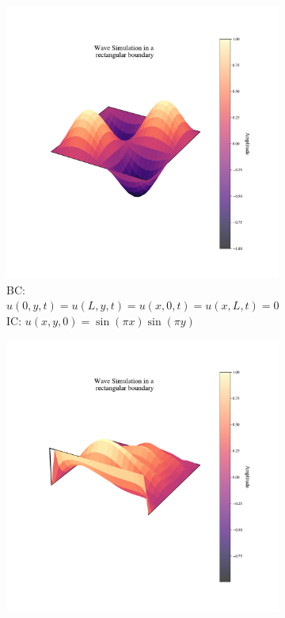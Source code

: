 \documentclass{article}
\begin{document}
\begin{figure}[htbp]
    \centering
    \begin{subfigure}{0.45\textwidth}
        \centering
        \includegraphics[width=\textwidth]{figures/Figure_1.pdf}
        \caption{BC: \(u(0, y, t) = u(L, y, t) = u(x, 0, t) = u(x, L, t) = 0\)\\ IC: \(u(x, y, 0) = \sin(\pi x) \sin(\pi y)\)}
    \end{subfigure}%
    \hfill
    \begin{subfigure}{0.45\textwidth}
        \centering
        \includegraphics[width=\textwidth]{figures/Figure_2.pdf}

\end{subfigure}
\end{figure}
\end{document}
